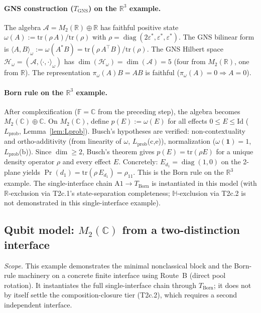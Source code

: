 \documentclass[11pt,a4paper]{article}
\theoremstyle{definition}
\newcommand{\eps}{\varepsilon}
\newcommand{\tr}{\mathrm{tr}}
\DeclareMathOperator{\diag}{diag}
\begin{document}
\paragraph{GNS construction ($T_{\mathrm{GNS}}$) on the $\mathbb{R}^3$ example.}
The algebra $\mathcal{A} = M_2(\mathbb{R}) \oplus \mathbb{R}$ has faithful positive state $\omega(A) := \tr(\rho\, A)/\tr(\rho)$ with $\rho = \diag(2\eps^*, \eps^*, \eps^*)$.  The GNS bilinear form is $\langle A, B\rangle_\omega := \omega(A^* B) = \tr(\rho\, A^\top B)/\tr(\rho)$.  The GNS Hilbert space $\mathcal{H}_\omega = (\mathcal{A}, \langle\cdot,\cdot\rangle_\omega)$ has $\dim(\mathcal{H}_\omega) = \dim(\mathcal{A}) = 5$ (four from $M_2(\mathbb{R})$, one from $\mathbb{R}$).  The representation $\pi_\omega(A)B = AB$ is faithful ($\pi_\omega(A) = 0 \Rightarrow A = 0$).

\paragraph{Born rule on the $\mathbb{R}^3$ example.}
After complexification ($\mathbb{F} = \mathbb{C}$ from the preceding step), the algebra becomes $M_2(\mathbb{C}) \oplus \mathbb{C}$.  On $M_2(\mathbb{C})$, define $p(E) := \omega(E)$ for all effects $0 \le E \le \mathrm{Id}$ ($L_{\mathrm{prob}}$, Lemma~\ref{lem:Lprob}).  Busch's hypotheses are verified: non-contextuality and ortho-additivity (from linearity of $\omega$, $L_{\mathrm{prob}}$(c,e)), normalization ($\omega(\mathbf{1}) = 1$, $L_{\mathrm{prob}}$(b)).  Since $\dim \ge 2$, Busch's theorem gives $p(E) = \tr(\rho E)$ for a unique density operator $\rho$ and every effect $E$.  Concretely: $E_{d_1} = \diag(1,0)$ on the 2-plane yields $\Pr(d_1) = \tr(\rho\, E_{d_1}) = \rho_{11}$.  This is the Born rule on the $\mathbb{R}^3$ example.  The single-interface chain $\mathrm{A1} \to T_{\mathrm{Born}}$ is instantiated in this model (with $\mathbb{R}$-exclusion via T2c.1's state-separation completeness; $\mathbb{H}$-exclusion via T2c.2 is not demonstrated in this single-interface example).

\subsection{Qubit model: $M_2(\mathbb{C})$ from a two-distinction interface}
\label{sec:qubit_model}

\noindent\textit{Scope.}  This example demonstrates the minimal nonclassical block and the Born-rule machinery on a concrete finite interface using Route~B (direct pool rotation).  It instantiates the full single-interface chain through $T_{\mathrm{Born}}$; it does not by itself settle the composition-closure tier (T2c.2), which requires a second independent interface.
\end{document}
